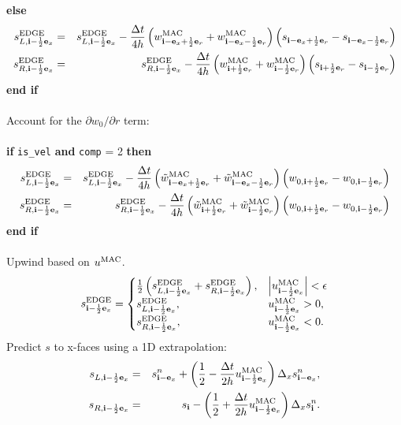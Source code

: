 {\bf else}
\begin{eqnarray}
s_{L,{\bf i}-\frac{1}{2}{\bf e}_x}^{\rm EDGE} &=& s_{L,{\bf i}-\frac{1}{2}{\bf e}_x}^{\rm EDGE} -
\frac{\Delta t}{4h}\left(w^{\rm MAC}_{{\bf i}-{\bf e}_x+\frac{1}{2}{\bf e}_r} + w^{\rm MAC}_{{\bf i}-{\bf e}_x-\frac{1}{2}{\bf e}_r}\right)\left(s_{{\bf i}-{\bf e}_x+\frac{1}{2}{\bf e}_r} - s_{{\bf i}-{\bf e}_x-\frac{1}{2}{\bf e}_r}\right)\\
s_{R,{\bf i}-\frac{1}{2}{\bf e}_x}^{\rm EDGE} &=& s_{R,{\bf i}-\frac{1}{2}{\bf e}_x}^{\rm EDGE} -
\frac{\Delta t}{4h}\left(w^{\rm MAC}_{{\bf i}+\frac{1}{2}{\bf e}_r} + w^{\rm MAC}_{{\bf i}-\frac{1}{2}{\bf e}_r}\right)\left(s_{{\bf i}+\frac{1}{2}{\bf e}_r} - s_{{\bf i}-\frac{1}{2}{\bf e}_r}\right)
\end{eqnarray}
{\bf end if}\\ \\
Account for the $\partial w_0/\partial r$ term:\\ \\
{\bf if} {\tt is\_vel} {\bf and} {\tt comp} = 2 {\bf then}
\begin{eqnarray}
s_{L,{\bf i}-\frac{1}{2}{\bf e}_x}^{\rm EDGE} &=& s_{L,{\bf i}-\frac{1}{2}{\bf e}_x}^{\rm EDGE} - 
\frac{\Delta t}{4h}\left(\tilde{w}^{\rm MAC}_{{\bf i}-{\bf e}_x+\frac{1}{2}{\bf e}_r} + \tilde{w}^{\rm MAC}_{{\bf i}-{\bf e}_x-\frac{1}{2}{\bf e}_r}\right)\left(w_{0,{\bf i}+\frac{1}{2}{\bf e}_r}-w_{0,{\bf i}-\frac{1}{2}{\bf e}_r}\right) \\
s_{R,{\bf i}-\frac{1}{2}{\bf e}_x}^{\rm EDGE} &=& s_{R,{\bf i}-\frac{1}{2}{\bf e}_x}^{\rm EDGE} -
\frac{\Delta t}{4h}\left(\tilde{w}^{\rm MAC}_{{\bf i}+\frac{1}{2}{\bf e}_r} + \tilde{w}^{\rm MAC}_{{\bf i}-\frac{1}{2}{\bf e}_r}\right)\left(w_{0,{\bf i}+\frac{1}{2}{\bf e}_r}-w_{0,{\bf i}-\frac{1}{2}{\bf e}_r}\right) \\
\end{eqnarray}
{\bf end if}\\ \\
Upwind based on $u^{\rm MAC}$.
\begin{equation}
s_{{\bf i}-\frac{1}{2}{\bf e}_x}^{\rm EDGE} =
\begin{cases}
\frac{1}{2}\left(s_{L,{\bf i}-\frac{1}{2}{\bf e}_x}^{\rm EDGE} + s_{R,{\bf i}-\frac{1}{2}{\bf e}_x}^{\rm EDGE}\right), & \left|u^{\rm MAC}_{{\bf i}-\frac{1}{2}{\bf e}_x}\right| < \epsilon \\
s_{L,{\bf i}-\frac{1}{2}{\bf e}_x}^{\rm EDGE}, & u^{\rm MAC}_{{\bf i}-\frac{1}{2}{\bf e}_x} > 0, \\
s_{R,{\bf i}-\frac{1}{2}{\bf e}_x}^{\rm EDGE}, & u^{\rm MAC}_{{\bf i}-\frac{1}{2}{\bf e}_x} < 0.
\end{cases}
\end{equation}
Predict $s$ to x-faces using a 1D extrapolation:
\begin{eqnarray}
s_{L,{\bf i}-\frac{1}{2}{\bf e}_x} &=& s_{{\bf i}-{\bf e}_x}^n + \left(\frac{1}{2} - \frac{\Delta t}{2h}u_{{\bf i}-\frac{1}{2}{\bf e}_x}^{\rm MAC}\right)\Delta_x s_{{\bf i}-{\bf e}_x}^n, \\
s_{R,{\bf i}-\frac{1}{2}{\bf e}_x} &=& s_{{\bf i}} - \left(\frac{1}{2} + \frac{\Delta t}{2h}u_{{\bf i}-\frac{1}{2}{\bf e}_x}^{\rm MAC}\right)\Delta_x s_{{\bf i}}^n.
\end{eqnarray}
